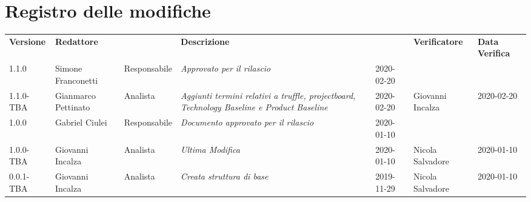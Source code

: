 \section*{Registro delle modifiche}
\renewcommand{\arraystretch}{1.8}
  \setlength\LTleft{-1.7cm}
  \begin{longtable}{|p{1.7cm}|p{2cm}|p{2.5cm}|p{3cm}|p{1.7cm}|p{2cm}|p{2.3cm}|}
    \hline
    \rowcolor{header}
    \textbf{Versione} & \textbf{Redattore} & \centering{\textbf{Ruolo}} & \textbf{Descrizione} &      \centering{\textbf{Data}} & \textbf{Verificatore} & \textbf{Data Verifica} \\
    1.1.0 & Simone Franconetti & Responsabile & \small{\textit{Approvato per il rilascio}} & 2020-02-20 & & \\
    1.1.0-TBA & Gianmarco Pettinato & Analista & \small{\textit{Aggiunti termini relativi a truffle, projectboard, Technology Baseline e Product Baseline}} & 2020-02-20 & Giovanni Incalza & 2020-02-20\\
    1.0.0 & Gabriel Ciulei & Responsabile & \small{\textit{ Documento approvato per il rilascio }} & 2020-01-10 & &\\
    1.0.0-TBA & Giovanni Incalza & Analista & \small{\textit{ Ultima Modifica }} & 2020-01-10 & Nicola Salvadore & 2020-01-10\\
    0.0.1-TBA & Giovanni Incalza & Analista & \small{\textit{ Creata struttura di base }} & 2019-11-29 & Nicola Salvadore & 2020-01-10 \\
    \hline
  \end{longtable}
  \setlength\LTleft{0cm}
